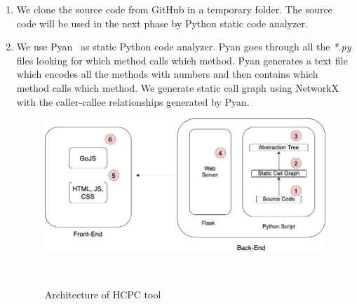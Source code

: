 \begin{enumerate}
    \item We clone the source code from GitHub in a temporary folder. The source code will be used in the next phase by Python static code analyzer.
    \item We use Pyan~\cite{pyan} as static Python code analyzer. Pyan goes through all the \emph{*.py} files looking for which method calls which method. Pyan generates a text file  which encodes all the methods with numbers and then contains which method calls which method. We generate static call graph using NetworkX~\cite{networkx} with the caller-callee relationships generated by Pyan.
    
\begin{figure}[h]
\centering
\includegraphics[width=\columnwidth]{figures/hla3/hla3_implementation.png}
\caption{Architecture of HCPC tool }~\label{fig:architecture}
\end{figure}


\end{enumerate}
